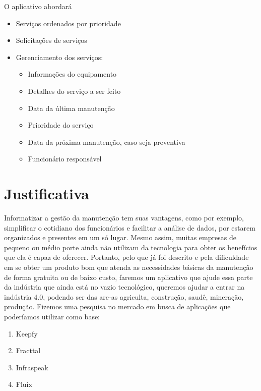 \documentclass[%
  a4paper,%
  12pt,%
  english,%
  brazilian,%
]{article}
\begin{document}
O aplicativo abordará 
\begin{itemize}
    \item Serviços ordenados por prioridade
    \item Solicitações de serviços
    \item Gerenciamento dos serviços:
    \begin{itemize}
    \item Informações do equipamento
    \item Detalhes do serviço a ser feito
    \item Data da última manutenção
    \item Prioridade do serviço
    \item Data da próxima manutenção, caso seja preventiva
    \item Funcionário responsável
    \end{itemize}
\end{itemize}
    

\section{Justificativa}%
Informatizar a gestão da manutenção tem suas vantagens, como por exemplo, simplificar o cotidiano dos funcionários e facilitar a análise de dados, por estarem organizados e presentes em um só lugar. Mesmo assim, muitas empresas de pequeno ou médio porte ainda não utilizam da tecnologia para obter os benefícios que ela é capaz de oferecer. Portanto, pelo que já foi descrito e pela dificuldade em se obter um produto bom que atenda as necessidades básicas da manutenção de forma gratuita ou de baixo custo, faremos um aplicativo que ajude essa parte da indústria que ainda está no vazio tecnológico, queremos ajudar a entrar na indústria 4.0, podendo ser das are-as agriculta, construção, saudê, mineração, produção.
Fizemos uma pesquisa no mercado em busca de aplicações que poderíamos utilizar como base:
\begin{enumerate}
    \item Keepfy
    \item Fracttal
    \item Infraspeak
    \item Fluix
\end{enumerate}

\end{document}
